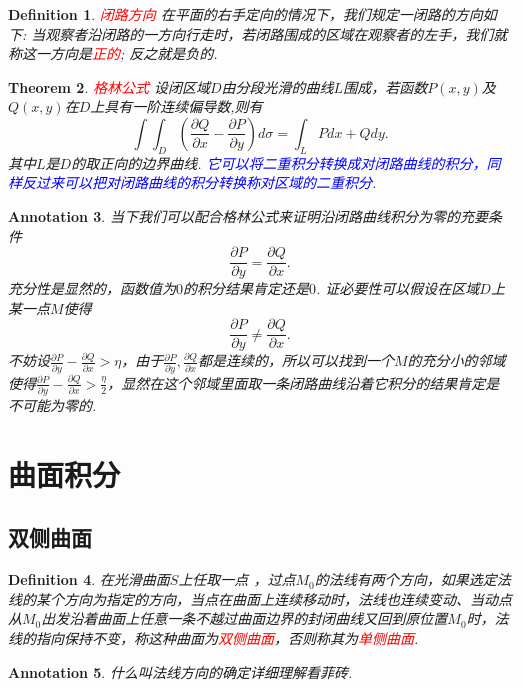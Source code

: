 \documentclass{article}
\newtheorem{theorem}{Theorem}[section]
\newtheorem{definition}[theorem]{Definition}
\newtheorem{annotation}[theorem]{Annotation}
\newcommand{\redt}[1]{\textcolor{red}{#1}}
\newcommand{\bluet}[1]{\textcolor{blue}{#1}}
\begin{document}
\begin{definition}
\rm \redt{闭路方向} 在平面的右手定向的情况下，我们规定一闭路的方向如下: 当观察者沿闭路的一方向行走时，若闭路围成的区域在观察者的左手，我们就称这一方向是\redt{正的}; 反之就是负的. 
\end{definition}

\begin{theorem}
\rm \redt{格林公式} 设闭区域$D$由分段光滑的曲线$L$围成，若函数$P(x,y)$及$Q(x,y)$在$D$上具有一阶连续偏导数,则有
$$
\int\int_D \left( \frac{\partial Q}{\partial x} - \frac{\partial P}{\partial y} \right)d\sigma = \int_L Pdx+Qdy.
$$
其中$L$是$D$的取正向的边界曲线. \bluet{它可以将二重积分转换成对闭路曲线的积分，同样反过来可以把对闭路曲线的积分转换称对区域的二重积分}. 
\end{theorem}

\begin{annotation}
\rm 当下我们可以配合格林公式来证明沿闭路曲线积分为零的充要条件
$$
\frac{\partial P}{\partial y} = \frac{\partial Q}{\partial x}.
$$
充分性是显然的，函数值为$0$的积分结果肯定还是$0$. 证必要性可以假设在区域$D$上某一点$M$使得
$$
\frac{\partial P}{\partial y} \neq \frac{\partial Q}{\partial x}.
$$
不妨设$\frac{\partial P}{\partial y} - \frac{\partial Q}{\partial x} > \eta$，由于$\frac{\partial P}{\partial y} ,\frac{\partial Q}{\partial x}$都是连续的，所以可以找到一个$M$的充分小的邻域使得$\frac{\partial P}{\partial y} - \frac{\partial Q}{\partial x} > \frac{\eta}{2}$，显然在这个邻域里面取一条闭路曲线沿着它积分的结果肯定是不可能为零的. 
\end{annotation}

\newpage
\section{曲面积分}

\subsection{双侧曲面}

\begin{definition}
\rm 在光滑曲面$S$上任取一点 ，过点$M_0$的法线有两个方向，如果选定法线的某个方向为指定的方向，当点在曲面上连续移动时，法线也连续变动、当动点从$M_0$出发沿着曲面上任意一条不越过曲面边界的封闭曲线又回到原位置$M_0$时，法线的指向保持不变，称这种曲面为\redt{双侧曲面}，否则称其为\redt{单侧曲面}.
\end{definition}

\begin{annotation}
\rm 什么叫法线方向的确定详细理解看菲砖.
\end{annotation}
\end{document}
